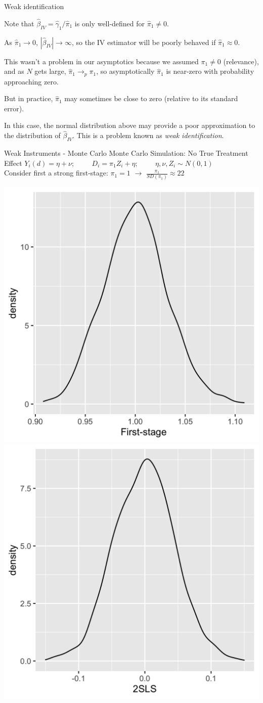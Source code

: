 \documentclass[11pt,english,handout]{beamer}
\newenvironment{wideitemize}{\itemize\addtolength{\itemsep}{10pt}}{\enditemize}
\begin{document}
\begin{frame}{Weak identification}
	\begin{wideitemize}
		\item
		Note that $\hat\beta_{IV} = \hat\gamma_1 / \hat\pi_1$ is only well-defined for $\hat\pi_1 \neq 0$.
		
		\item
		As $\hat\pi_1 \rightarrow 0$, $|\hat\beta_{IV}| \rightarrow \infty$, so the IV estimator will be poorly behaved if $\hat\pi_1 \approx 0$.
		
		\pause
		\item
		This wasn't a problem in our asymptotics because we assumed $\pi_1 \neq 0$ (relevance), and as $N$ gets large, $\hat\pi_1 \rightarrow_p \pi_1$, so asymptotically $\hat\pi_1$ is near-zero with probability approaching zero. 
		
		\pause
		\item
		But in practice, $\hat\pi_1$ may sometimes be close to zero (relative to its standard error).
		
		\item
		In this case, the normal distribution above may provide a poor approximation to the distribution of $\hat\beta_{IV}$.  This is a problem known as \textit{weak identification}.
	\end{wideitemize}
\end{frame}


\begin{frame}{Weak Instruments - Monte Carlo}
Monte Carlo Simulation: No True Treatment Effect
$Y_i(d)= \eta + \nu; \hspace{1cm}  D_i = \pi_1 Z_i + \eta; \hspace{1cm}  \eta, \nu, Z_i \sim N(0,1)$ 	\\

\pause{}
Consider first a strong first-stage: $\pi_1 =1$ $\rightarrow$ $\frac{\pi_1}{SD(\pi_1)} \approx 22$

\includegraphics[width = 0.45 \linewidth]{fs-strong} \pause{} \includegraphics[width = 0.45 \linewidth]{iv-strong}
\end{frame}
\end{document}
